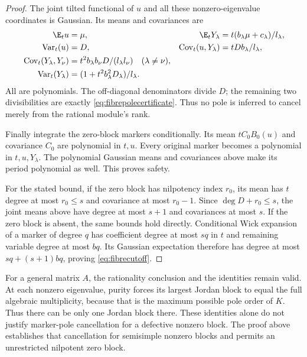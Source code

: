 \begin{proof}
The joint tilted functional of $u$ and all these nonzero-eigenvalue
coordinates is Gaussian. Its means and covariances are
\begin{align*}
 \E_tu&=\mu,&\E_tY_\lambda
   &=t(b_\lambda\mu+c_\lambda)/l_\lambda,\\
 \operatorname{Var}_t(u)&=D,&
 \operatorname{Cov}_t(u,Y_\lambda)&=tDb_\lambda/l_\lambda,\\
 \operatorname{Cov}_t(Y_\lambda,Y_\nu)
   &=t^2b_\lambda b_\nu D/(l_\lambda l_\nu)\quad(\lambda\ne\nu),&&\\
 \operatorname{Var}_t(Y_\lambda)
   &=(1+t^2b_\lambda^2D_\lambda)/l_\lambda.&&
\end{align*}
All are polynomials. The off-diagonal denominators divide $D$;
the remaining two divisibilities are exactly
\eqref{eq:fibrepolecertificate}. Thus no pole is inferred to
cancel merely from the rational module's rank.

Finally integrate the zero-block markers conditionally. Its
mean $tC_0B_0(u)$ and covariance $C_0$ are polynomial in $t,u$.
Every original marker becomes a polynomial in $t,u,Y_\lambda$.
The polynomial Gaussian means and covariances above make its
period polynomial as well. This proves safety.

For the stated bound, if the zero block has nilpotency index
$r_0$, its mean has $t$ degree at most $r_0\le s$ and covariance
at most $r_0-1$. Since $\deg D+r_0\le s$, the joint means
above have degree at most $s+1$ and covariances at most $s$.
If the zero block is absent, the same bounds hold directly.
Conditional Wick expansion of a marker of degree $q$ has
coefficient degree at most $sq$ in $t$ and remaining variable
degree at most $bq$. Its Gaussian expectation therefore has
degree at most $sq+(s+1)bq$, proving
\eqref{eq:fibrecutoff}.
\end{proof}

For a general matrix $A$, the rationality conclusion and the
identities remain valid. At each nonzero eigenvalue, purity forces its
largest Jordan block to equal the full algebraic multiplicity,
because that is the maximum possible pole order of $K$.
Thus there can be only one Jordan block there. These identities alone
do not justify marker-pole cancellation for a defective nonzero block.
The proof above establishes that cancellation for semisimple nonzero
blocks and permits an unrestricted nilpotent zero block.
